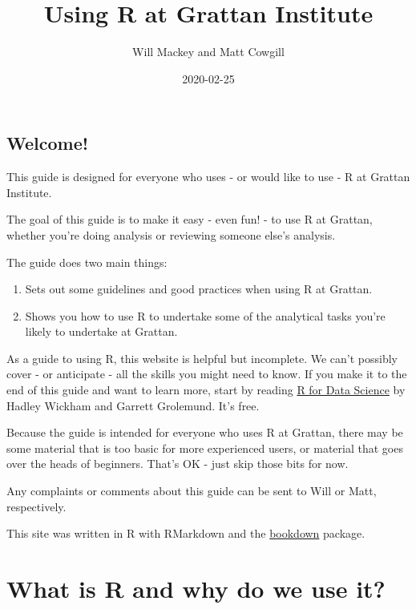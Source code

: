 \documentclass[]{book}
\title{Using R at Grattan Institute}
\author{Will Mackey and Matt Cowgill}
\date{2020-02-25}
\providecommand{\tightlist}{%
  \setlength{\itemsep}{0pt}\setlength{\parskip}{0pt}}
\begin{document}
\maketitle

{
\setcounter{tocdepth}{1}
\tableofcontents
}
\hypertarget{welcome}{%
\chapter*{Welcome!}\label{welcome}}

This guide is designed for everyone who uses - or would like to use - R at Grattan Institute.

The goal of this guide is to make it easy - even fun! - to use R at Grattan, whether you're doing analysis or reviewing someone else's analysis.

The guide does two main things:

\begin{enumerate}
\def\labelenumi{\arabic{enumi}.}
\tightlist
\item
  Sets out some guidelines and good practices when using R at Grattan.
\item
  Shows you how to use R to undertake some of the analytical tasks you're likely to undertake at Grattan.
\end{enumerate}

As a guide to using R, this website is helpful but incomplete. We can't possibly cover - or anticipate - all the skills you might need to know. If you make it to the end of this guide and want to learn more, start by reading \href{https://r4ds.had.co.nz}{R for Data Science} by Hadley Wickham and Garrett Grolemund. It's free.

Because the guide is intended for everyone who uses R at Grattan, there may be some material that is too basic for more experienced users, or material that goes over the heads of beginners. That's OK - just skip those bits for now.

Any complaints or comments about this guide can be sent to Will or Matt, respectively.

This site was written in R with RMarkdown and the \href{https://bookdown.org}{bookdown} package.

\hypertarget{part-what-is-r-and-why-do-we-use-it}{%
\part{What is R and why do we use it?}\label{part-what-is-r-and-why-do-we-use-it}}
\end{document}
